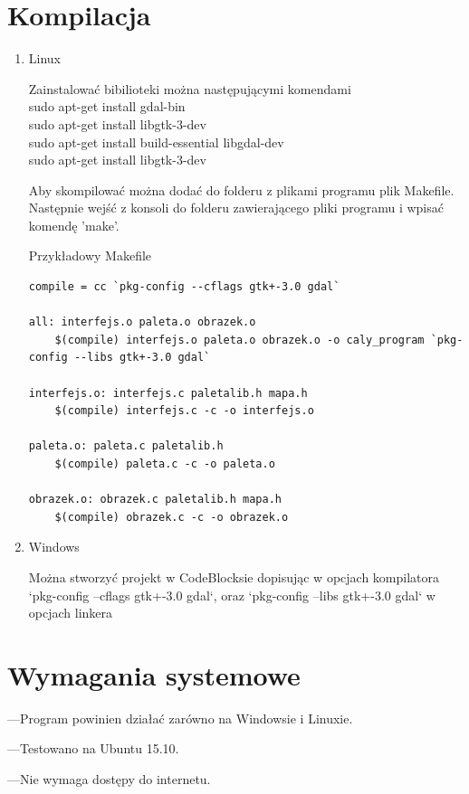 \documentclass[a4paper]{article}
\begin{document}
 
 \section{Kompilacja}
\begin{enumerate}
\item{Linux}

Zainstalować bibilioteki można następującymi komendami\\
sudo apt-get install gdal-bin\\
sudo apt-get install libgtk-3-dev\\
sudo apt-get install build-essential libgdal-dev\\
sudo apt-get install libgtk-3-dev

Aby skompilować można dodać do folderu z plikami programu plik Makefile.\\ 
Następnie wejść z konsoli do folderu zawierającego pliki programu i wpisać komendę 'make'.

Przykładowy Makefile
\begin{lstlisting}
compile = cc `pkg-config --cflags gtk+-3.0 gdal`

all: interfejs.o paleta.o obrazek.o
	$(compile) interfejs.o paleta.o obrazek.o -o caly_program `pkg-config --libs gtk+-3.0 gdal`

interfejs.o: interfejs.c paletalib.h mapa.h
	$(compile) interfejs.c -c -o interfejs.o 

paleta.o: paleta.c paletalib.h
	$(compile) paleta.c -c -o paleta.o 
	
obrazek.o: obrazek.c paletalib.h mapa.h
	$(compile) obrazek.c -c -o obrazek.o

\end{lstlisting}



\item{Windows}

Można stworzyć projekt w CodeBlocksie dopisując w opcjach kompilatora `pkg-config --cflags gtk+-3.0 gdal`, oraz `pkg-config --libs gtk+-3.0 gdal` w opcjach linkera

\end{enumerate}
\section{Wymagania systemowe}
---Program powinien działać zarówno na Windowsie i Linuxie.

---Testowano na Ubuntu 15.10.

---Nie wymaga dostępy do internetu.
\end{document}
